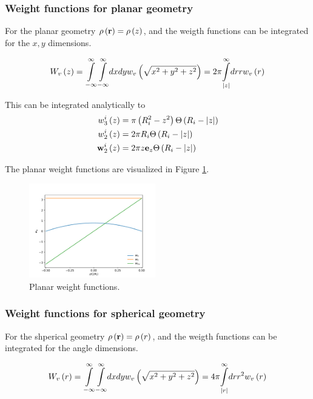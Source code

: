 \documentclass[12pt, letterpaper]{article}
\newcommand*{\abs}[1]{\lvert#1\rvert}
\newcommand*{\lb}{\ensuremath{\left(}}
\newcommand*{\rb}{\ensuremath{\right)}}
\begin{document}
\subsubsection{Weight functions for planar geometry}
\label{sec:planar_weights}
For the planar geometry $\rho \lb \mathbf{r} \rb = \rho \lb z \rb $,
and the weigth functions can be integrated for the $x,y$ dimensions.

\begin{equation}
  W_v \lb z \rb = \underset{-\infty}{\overset{\infty}{\int}} \underset{-\infty}{\overset{\infty}{\int}} dx dy w_v \lb \sqrt{x^2 + y^2 + z^2} \rb = 2 \pi \underset{\abs{z}}{\overset{\infty}{\int}} dr r  w_v \lb r \rb
\end{equation}

This can be integrated analytically to
\begin{align}
  w_3^i \lb z \rb &=  \pi \lb R_i^2 - z^2 \rb \Theta \lb R_i - \abs{z} \rb \\
  w_2^i \lb z \rb &=  2 \pi R_i \Theta \lb R_i - \abs{z} \rb \\
  \mathbf{w}_2^i \lb z \rb &= 2 \pi z \mathbf{e}_z  \Theta \lb R_i - \abs{z} \rb
\end{align}

The planar weight functions are visualized in Figure
\ref{fig:planar_weights}.
\begin{figure}[tbp]
  \centering
  \includegraphics[width=0.49\textwidth]{gfx/planar_weights}
  \caption{Planar weight functions.}
  \label{fig:planar_weights}
\end{figure}

\subsubsection{Weight functions for spherical geometry}

For the shperical geometry $\rho \lb \mathbf{r} \rb = \rho \lb r \rb $,
and the weigth functions can be integrated for the angle dimensions.

\begin{equation}
  W_v \lb r \rb = \underset{-\infty}{\overset{\infty}{\int}} \underset{-\infty}{\overset{\infty}{\int}} dx dy w_v \lb \sqrt{x^2 + y^2 + z^2} \rb = 4 \pi \underset{\abs{r}}{\overset{\infty}{\int}} dr r^2  w_v \lb r \rb
\end{equation}
\end{document}
